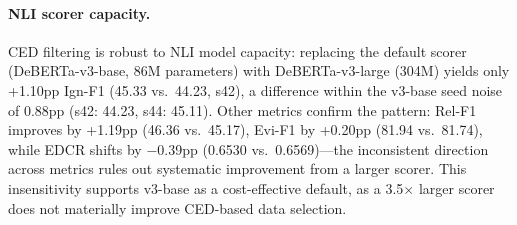 \paragraph{NLI scorer capacity.} CED filtering is robust to NLI model capacity: replacing the default scorer (DeBERTa-v3-base, 86M parameters) with DeBERTa-v3-large (304M) yields only +1.10pp Ign-F1 (45.33 vs.\ 44.23, s42), a difference within the v3-base seed noise of 0.88pp (s42: 44.23, s44: 45.11). Other metrics confirm the pattern: Rel-F1 improves by +1.19pp (46.36 vs.\ 45.17), Evi-F1 by +0.20pp (81.94 vs.\ 81.74), while EDCR shifts by $-$0.39pp (0.6530 vs.\ 0.6569)---the inconsistent direction across metrics rules out systematic improvement from a larger scorer. This insensitivity supports v3-base as a cost-effective default, as a 3.5$\times$ larger scorer does not materially improve CED-based data selection.

\begin{table}[t]
\centering
\caption{Full RSFT ablation on DocRED dev set (Qwen3-4B). CED and flat-NLI denote the scoring function used for candidate selection. Best Ign-F1 among evidence-generating methods in \textbf{bold}.}
\label{tab:ablation_full}
\small
{}
\end{table}


